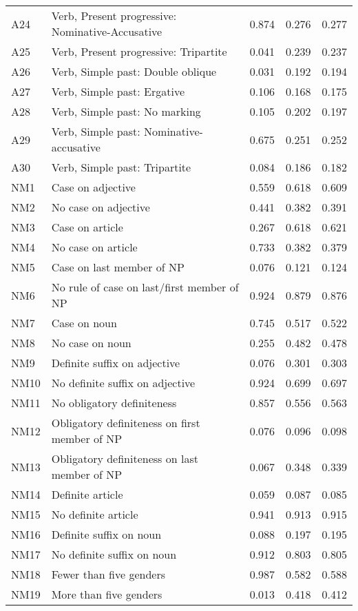 \begin{longtable}{lllll}
A24 & Verb, Present progressive: Nominative-Accusative & 0.874 & 0.276 & 0.277\\
A25 & Verb, Present progressive: Tripartite & 0.041 & 0.239 & 0.237\\
A26 & Verb, Simple past: Double oblique & 0.031 & 0.192 & 0.194\\
A27 & Verb, Simple past: Ergative & 0.106 & 0.168 & 0.175\\
A28 & Verb, Simple past: No marking & 0.105 & 0.202 & 0.197\\
A29 & Verb, Simple past: Nominative-accusative & 0.675 & 0.251 & 0.252\\
A30 & Verb, Simple past: Tripartite & 0.084 & 0.186 & 0.182\\
NM1 & Case on adjective & 0.559 & 0.618 & 0.609\\
NM2 & No case on adjective & 0.441 & 0.382 & 0.391\\
NM3 & Case on article & 0.267 & 0.618 & 0.621\\
NM4 & No case on article & 0.733 & 0.382 & 0.379\\
NM5 & Case on last member of NP & 0.076 & 0.121 & 0.124\\
NM6 & No rule of case on last/first member of NP & 0.924 & 0.879 & 0.876\\
NM7 & Case on noun & 0.745 & 0.517 & 0.522\\
NM8 & No case on noun & 0.255 & 0.482 & 0.478\\
NM9 & Definite suffix on adjective & 0.076 & 0.301 & 0.303\\
NM10 & No definite suffix on adjective & 0.924 & 0.699 & 0.697\\
NM11 & No obligatory definiteness & 0.857 & 0.556 & 0.563\\
NM12 & Obligatory definiteness on first member of NP & 0.076 & 0.096 & 0.098\\
NM13 & Obligatory definiteness on last member of NP & 0.067 & 0.348 & 0.339\\
NM14 & Definite article & 0.059 & 0.087 & 0.085\\
NM15 & No definite article & 0.941 & 0.913 & 0.915\\
NM16 & Definite suffix on noun & 0.088 & 0.197 & 0.195\\
NM17 & No definite suffix on noun & 0.912 & 0.803 & 0.805\\
NM18 & Fewer than five genders & 0.987 & 0.582 & 0.588\\
NM19 & More than five genders & 0.013 & 0.418 & 0.412\\

\end{longtable}
